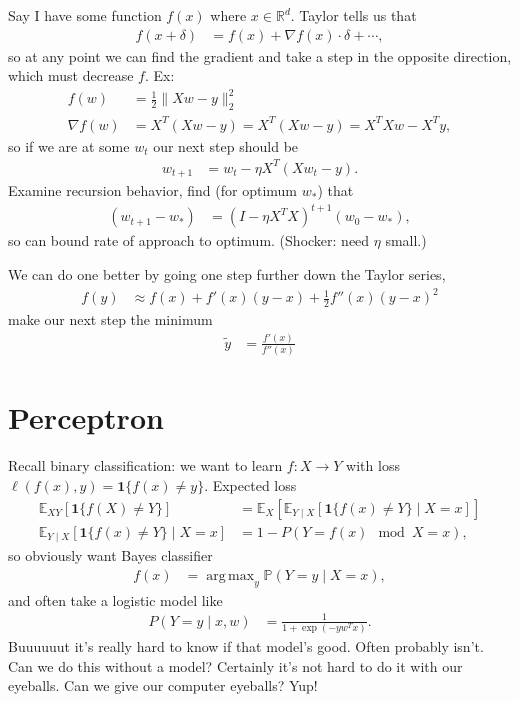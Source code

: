\documentclass[11pt,letterpaper]{article}
\DeclareMathOperator*{\argmax}{arg\,max}
\theoremstyle{definition}
\numberwithin{equation}{section}
\numberwithin{figure}{section}
\begin{document}
Say I have some function $f(x)$ where $x \in \mathbb{R}^d$. Taylor tells us that
%
\begin{align}
	f(x + \delta) &= f(x) + \nabla f(x) \cdot \delta + \cdots,
\end{align}
%
so at any point we can find the gradient and take a step in the opposite direction, which must decrease $f$. Ex:
%
\begin{align}
	f(w) &= \frac{1}{2} \|X w - y\|_2^2\\
	\nabla f(w) &= X^T(Xw -y) = X^T (Xw -y) = X^T X w - X^T y,
\end{align}
%
so if we are at some $w_t$ our next step should be
%
\begin{align}
	w_{t+1} &= w_t - \eta X^T(X w_t - y).
\end{align}
%
Examine recursion behavior, find (for optimum $w_\ast$) that
%
\begin{align}
	(w_{t+1} - w_\ast) &= \left(I - \eta X^T X \right)^{t+1} (w_0 - w_\ast),
\end{align}
%
so can bound rate of approach to optimum. (Shocker: need $\eta$ small.)


We can do one better by going one step further down the Taylor series,
%
\begin{align}
	f(y) &\approx f(x) + f'(x) (y-x) + \frac{1}{2} f''(x) (y-x)^2
\end{align}
%
make our next step the minimum
%
\begin{align}
	\tilde{y} &= \frac{f'(x)}{f''(x)}
\end{align}










\section{Perceptron}
Recall binary classification: we want to learn $f: X \to Y$ with loss $\ell(f(x),y) = \bm{1}\{f(x)\neq y\}$. Expected loss
%
\begin{align}
	\mathbb{E}_{XY} \left[\bm{1}\{f(X)\neq Y\}\right] &= \mathbb{E}_X\left[\mathbb{E}_{Y\mid X} \left[\bm{1}\{f(x) \neq Y\}\mid X=x\right]\right]\\
	\mathbb{E}_{Y\mid X} \left[\bm{1}\{f(x) \neq Y\}\mid X=x\right] &= 1 - P\left(Y=f(x) \mod X=x\right),
\end{align}
%
so obviously want Bayes classifier
%
\begin{align}
	f(x) &= \argmax_{y} \mathbb{P}\left(Y=y\mid X=x\right),
\end{align}
%
and often take a logistic model like
%
\begin{align}
	P(Y=y\mid x,w) &= \frac{1}{1+ \exp(-yw^T x)}.
\end{align}
%
Buuuuuut it's really hard to know if that model's good. Often probably isn't. Can we do this without a model? Certainly it's not hard to do it with our eyeballs. Can we give our computer eyeballs? Yup!
\end{document}
